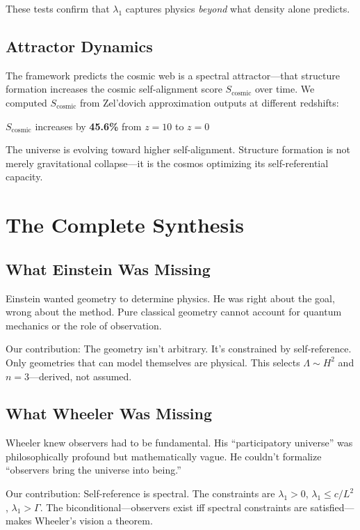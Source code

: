 \documentclass[11pt,a4paper]{article}
\theoremstyle{definition}
\theoremstyle{remark}
\begin{document}
These tests confirm that $\lambda_1$ captures physics \emph{beyond} what density alone predicts.

\subsection{Attractor Dynamics}

The framework predicts the cosmic web is a spectral attractor---that structure formation increases the cosmic self-alignment score $S_{\text{cosmic}}$ over time. We computed $S_{\text{cosmic}}$ from Zel'dovich approximation outputs at different redshifts:

\begin{center}
$S_{\text{cosmic}}$ increases by \textbf{45.6\%} from $z=10$ to $z=0$
\end{center}

The universe is evolving toward higher self-alignment. Structure formation is not merely gravitational collapse---it is the cosmos optimizing its self-referential capacity.

\section{The Complete Synthesis}

\subsection{What Einstein Was Missing}

Einstein wanted geometry to determine physics. He was right about the goal, wrong about the method. Pure classical geometry cannot account for quantum mechanics or the role of observation.

Our contribution: The geometry isn't arbitrary. It's constrained by self-reference. Only geometries that can model themselves are physical. This selects $\Lambda \sim H^2$ and $n = 3$---derived, not assumed.

\subsection{What Wheeler Was Missing}

Wheeler knew observers had to be fundamental. His ``participatory universe'' was philosophically profound but mathematically vague. He couldn't formalize ``observers bring the universe into being.''

Our contribution: Self-reference is spectral. The constraints are $\lambda_1 > 0$, $\lambda_1 \leq c/L^2$, $\lambda_1 > \Gamma$. The biconditional---observers exist iff spectral constraints are satisfied---makes Wheeler's vision a theorem.
\end{document}
